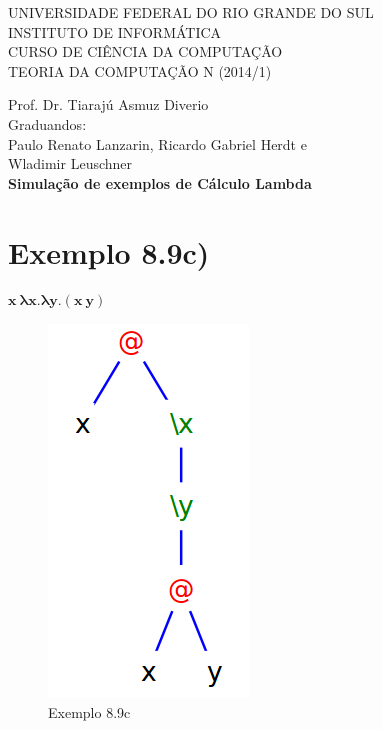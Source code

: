 \documentclass[a4paper]{article}
\begin{document}
\begin{center}


\large{ 
\uppercase{ Universidade Federal do Rio Grande do Sul\\

Instituto de Informática \\

Curso de Ciência da Computação \\

Teoria da Computação N (2014/1)\\
}

Prof. Dr. Tiarajú Asmuz Diverio \\


Graduandos: \\ Paulo Renato Lanzarin, Ricardo Gabriel Herdt e \\
	Wladimir Leuschner \\[1.5cm]


\LARGE {\bfseries Simulação de exemplos de Cálculo Lambda \\[1.0cm]
}}

\end{center}

\section*{Exemplo 8.9c)}

$\mathbf{x\ \lambda x.\lambda y.(x\ y)}$

\begin{figure}[h]
  \centering
  \includegraphics[scale=0.5]{8-9e.png}
  \caption{Exemplo 8.9c}
\end{figure}
\end{document}
